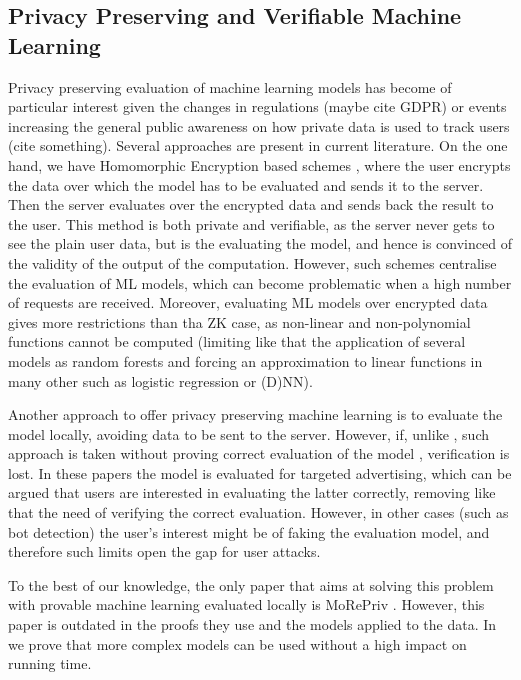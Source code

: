 \subsection{Privacy Preserving and Verifiable Machine Learning}
Privacy preserving evaluation of machine learning models has become of particular interest given the changes in regulations (maybe cite GDPR) or events increasing the general public awareness on how private data is used to track users (cite something). 
Several approaches are present in current literature. On the one hand, we have Homomorphic Encryption based schemes \cite{Dowlin:2016:CAN:3045390.3045413,mlconfidential,bos2013private}, where the user encrypts the data over which the model has to be evaluated and sends it to the server. Then the server evaluates over the encrypted data and sends back the result to the user. This method is both private and verifiable, as the server never gets to see the plain user data, but is the evaluating the model, and hence is convinced of the validity of the output of the computation. 
However, such schemes centralise the evaluation of ML models, which can become problematic when a high number of requests are received. 
Moreover, evaluating ML models over encrypted data gives more restrictions than tha ZK case, as non-linear and non-polynomial functions cannot be computed (limiting like that the application of several models as random forests and forcing an approximation to linear functions in many other such as logistic regression or (D)NN). 

Another approach to offer privacy preserving machine learning is to evaluate the model locally, avoiding data to be sent to the server. However, if, unlike \name, such approach is taken without proving correct evaluation of the model \cite{DBLP:journals/corr/abs-1710-03275,Bilenko:2011:PCP:2020408.2020475,Guha:2011:PPP:1972457.1972475}, verification is lost. In these papers the model is evaluated for targeted advertising, which can be argued that users are interested in evaluating the latter correctly, removing like that the need of verifying the correct evaluation. However, in other cases (such as bot detection) the user's interest might be of faking the evaluation model, and therefore such limits open the gap for user attacks. 

To the best of our knowledge, the only paper that aims at solving this problem with provable machine learning evaluated locally is MoRePriv \cite{Davidson:2014:MMO:2664243.2664266}. However, this paper is outdated in the proofs they use and the models applied to the data. In \name we prove that more complex models can be used without a high impact on running time. 
